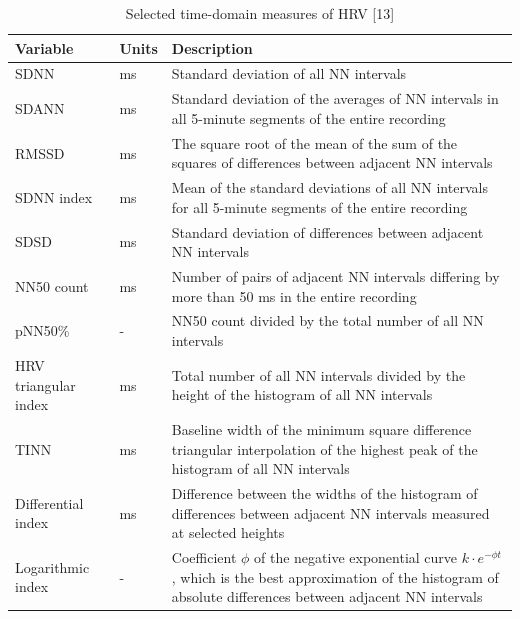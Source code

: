 \documentclass{article}
\begin{document}
\begin{table}[h]
\centering
\caption{Selected time-domain measures of HRV [13]}
\label{tab:HRV}
\begin{tabular}{llp{7cm}}
\hline
\textbf{Variable} & \textbf{Units} & \textbf{Description} \\ \hline
SDNN & ms & Standard deviation of all NN intervals \\ \hline
SDANN & ms & Standard deviation of the averages of NN intervals in all 5-minute segments of the entire recording \\ \hline
RMSSD & ms & The square root of the mean of the sum of the squares of differences between adjacent NN intervals \\ \hline
SDNN index & ms & Mean of the standard deviations of all NN intervals for all 5-minute segments of the entire recording \\ \hline
SDSD & ms & Standard deviation of differences between adjacent NN intervals \\ \hline
NN50 count & ms & Number of pairs of adjacent NN intervals differing by more than 50 ms in the entire recording \\ \hline
pNN50\% & - & NN50 count divided by the total number of all NN intervals \\ \hline
HRV triangular index & ms & Total number of all NN intervals divided by the height of the histogram of all NN intervals \\ \hline
TINN & ms & Baseline width of the minimum square difference triangular interpolation of the highest peak of the histogram of all NN intervals \\ \hline
Differential index & ms & Difference between the widths of the histogram of differences between adjacent NN intervals measured at selected heights \\ \hline
Logarithmic index & - & Coefficient $\phi$ of the negative exponential curve $k · e^{-\phi t}$, which is the best approximation of the histogram of absolute differences between adjacent NN intervals \\ \hline
\end{tabular}
\end{table}
\end{document}
